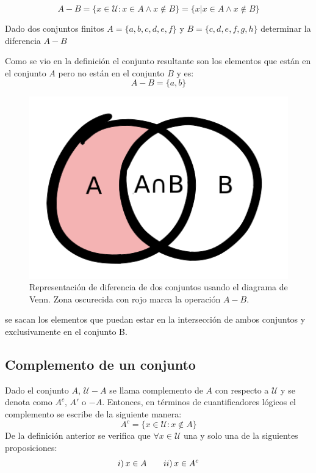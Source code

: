 \begin{equation}
A-B =\{x\in\mathcal{U}:x\in A\wedge x\notin B\}=\{x|x\in A\wedge x\notin B\}
\label{dif0}
\end{equation}
\begin{myexample}
Dado dos conjuntos finitos $A=\{a,b,c,d,e,f\}$ y $B=\{c,d,e,f,g,h\}$ determinar la diferencia $A-B$
\end{myexample}
Como se vio en la definición el conjunto resultante son los elementos que están en el conjunto $A$ pero no están en el conjunto $B$ y es:
\begin{equation*}
A-B=\{a,b\}
\end{equation*}

\begin{center}
	\begin{figure}[ht!]
	\centering
    		\includegraphics[scale=0.5]{FiguresBM/diferenciac.png}
    		\caption[Representación de diferencia de dos conjuntos]{Representación de diferencia de dos conjuntos usando el diagrama de Venn. Zona oscurecida con rojo marca la operación $A-B$.}
	\end{figure}
\end{center}

se sacan los elementos que puedan estar en la intersección de ambos conjuntos y exclusivamente en el conjunto B.

\subsection{Complemento de un conjunto}
Dado el conjunto $A$, $\mathcal{U}-A$ se llama complemento de $A$ con respecto a $\mathcal{U}$ y se denota como $A^{c}$, $A'$ o $-A$. Entonces, en términos de cuantificadores lógicos el complemento se escribe de la siguiente manera:
\begin{equation}
A^{c}=\{x\in\mathcal{U}:x\notin A\}
\end{equation}
De la definición anterior se verifica que $\forall x\in\mathcal{U}$  una y solo una de la siguientes proposiciones:
\begin{equation*}
i)\hspace{2px} x\in A \hspace{20px} ii)\hspace{2px} x\in A^{c}
\end{equation*}

